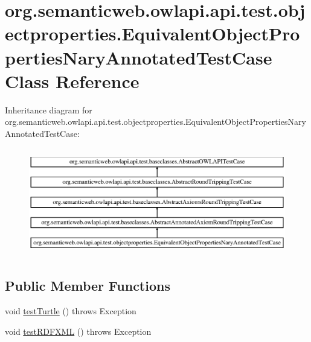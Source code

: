 \hypertarget{classorg_1_1semanticweb_1_1owlapi_1_1api_1_1test_1_1objectproperties_1_1_equivalent_object_properties_nary_annotated_test_case}{\section{org.\-semanticweb.\-owlapi.\-api.\-test.\-objectproperties.\-Equivalent\-Object\-Properties\-Nary\-Annotated\-Test\-Case Class Reference}
\label{classorg_1_1semanticweb_1_1owlapi_1_1api_1_1test_1_1objectproperties_1_1_equivalent_object_properties_nary_annotated_test_case}
}
Inheritance diagram for org.\-semanticweb.\-owlapi.\-api.\-test.\-objectproperties.\-Equivalent\-Object\-Properties\-Nary\-Annotated\-Test\-Case\-:\begin{figure}[H]
\begin{center}
\leavevmode
\includegraphics[height=4.761905cm]{classorg_1_1semanticweb_1_1owlapi_1_1api_1_1test_1_1objectproperties_1_1_equivalent_object_properties_nary_annotated_test_case}
\end{center}
\end{figure}
\subsection*{Public Member Functions}
\begin{DoxyCompactItemize}
\item 
void \hyperlink{classorg_1_1semanticweb_1_1owlapi_1_1api_1_1test_1_1objectproperties_1_1_equivalent_object_properties_nary_annotated_test_case_a5746f1e70db5b8798b98219f6ab64fa9}{test\-Turtle} ()  throws Exception 
\item 
void \hyperlink{classorg_1_1semanticweb_1_1owlapi_1_1api_1_1test_1_1objectproperties_1_1_equivalent_object_properties_nary_annotated_test_case_ad2abe634ec59bea1274f9d77e476030b}{test\-R\-D\-F\-X\-M\-L} ()  throws Exception 
\end{DoxyCompactItemize}
